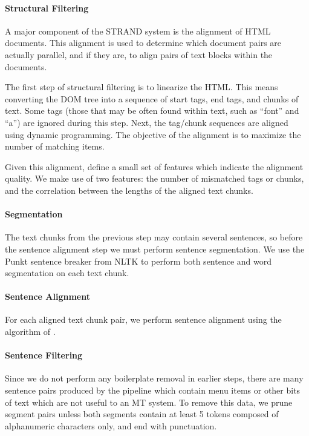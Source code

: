 \paragraph{Structural Filtering}
A major component of the STRAND system is the alignment of HTML documents. This
alignment is used to determine which document pairs are actually parallel, and
if they are, to align pairs of text blocks within the documents.

The first step of structural filtering is to linearize the HTML. This means
converting the DOM tree into a sequence of start tags, end tags, and chunks of
text. Some tags (those that may be often found within text, such as ``font'' and
``a'') are ignored during this step. Next, the tag/chunk sequences are aligned
using dynamic programming. The objective of the alignment is to maximize the
number of matching items.

Given this alignment, \citet{Resnik03} define a small set of features which
indicate the alignment quality. We make use of two features: the number of
mismatched tags or chunks, and the correlation between the lengths of the
aligned text chunks.


\paragraph{Segmentation}
The text chunks from the previous step may contain several sentences, so before
the sentence alignment step we must perform sentence segmentation. We use the
Punkt sentence breaker from NLTK \citep{nltk} to perform both sentence and word
segmentation on each text chunk.

\paragraph{Sentence Alignment}
For each aligned text chunk pair, we perform sentence alignment using the
algorithm of \citet{Gale93}.

\paragraph{Sentence Filtering}
Since we do not perform any boilerplate removal in earlier steps, there are many
sentence pairs produced by the pipeline which contain menu items or other bits
of text which are not useful to an MT system. To remove this data, we prune
segment pairs unless both segments contain at least 5 tokens composed of
alphanumeric characters only, and end with punctuation.
